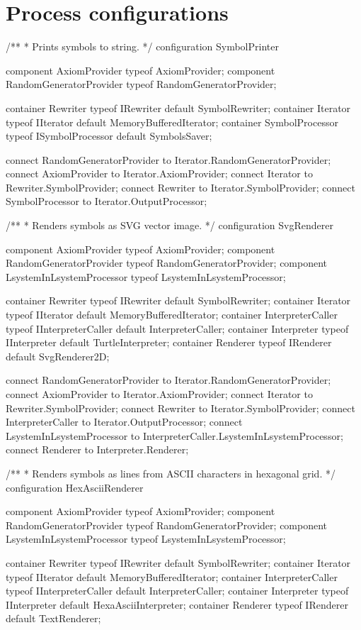 \section{Process configurations}

\begin{LsystemBreak}
/**
 * Prints symbols to string.
 */
configuration SymbolPrinter {
	component AxiomProvider typeof AxiomProvider;
	component RandomGeneratorProvider
		typeof RandomGeneratorProvider;

	container Rewriter typeof IRewriter default SymbolRewriter;
	container Iterator typeof IIterator
		default MemoryBufferedIterator;
	container SymbolProcessor typeof ISymbolProcessor
		default SymbolsSaver;

	connect RandomGeneratorProvider
		to Iterator.RandomGeneratorProvider;
	connect AxiomProvider to Iterator.AxiomProvider;
	connect Iterator to Rewriter.SymbolProvider;
	connect Rewriter to Iterator.SymbolProvider;
	connect SymbolProcessor to Iterator.OutputProcessor;
}

/**
 * Renders symbols as SVG vector image.
 */
configuration SvgRenderer {
	component AxiomProvider typeof AxiomProvider;
	component RandomGeneratorProvider
		typeof RandomGeneratorProvider;
	component LsystemInLsystemProcessor
		typeof LsystemInLsystemProcessor;

	container Rewriter typeof IRewriter default SymbolRewriter;
	container Iterator typeof IIterator
		default MemoryBufferedIterator;
	container InterpreterCaller typeof IInterpreterCaller
		default InterpreterCaller;
	container Interpreter typeof IInterpreter
		default TurtleInterpreter;
	container Renderer typeof IRenderer default SvgRenderer2D;

	connect RandomGeneratorProvider
		to Iterator.RandomGeneratorProvider;
	connect AxiomProvider to Iterator.AxiomProvider;
	connect Iterator to Rewriter.SymbolProvider;
	connect Rewriter to Iterator.SymbolProvider;
	connect InterpreterCaller to Iterator.OutputProcessor;
	connect LsystemInLsystemProcessor
		to InterpreterCaller.LsystemInLsystemProcessor;
	connect Renderer to Interpreter.Renderer;
}

/**
 * Renders symbols as lines from ASCII characters in hexagonal grid.
 */
configuration HexAsciiRenderer {
	component AxiomProvider typeof AxiomProvider;
	component RandomGeneratorProvider
		typeof RandomGeneratorProvider;
	component LsystemInLsystemProcessor
		typeof LsystemInLsystemProcessor;

	container Rewriter typeof IRewriter default SymbolRewriter;
	container Iterator typeof IIterator
		default MemoryBufferedIterator;
	container InterpreterCaller typeof IInterpreterCaller
		default InterpreterCaller;
	container Interpreter typeof IInterpreter
		default HexaAsciiInterpreter;
	container Renderer typeof IRenderer default TextRenderer;

}
\end{LsystemBreak}
